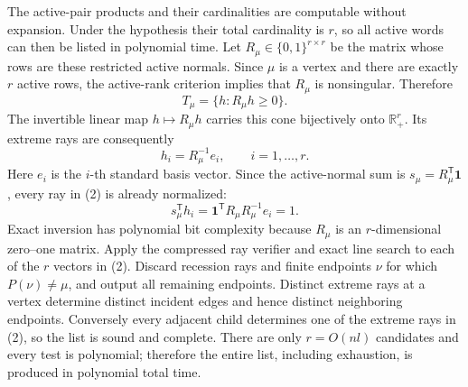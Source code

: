 The active-pair products and their cardinalities are computable without expansion. Under the hypothesis their total cardinality is \(r\), so all active words can then be listed in polynomial time. Let \(R_\mu\in\{0,1\}^{r\times r}\) be the matrix whose rows are these restricted active normals. Since \(\mu\) is a vertex and there are exactly \(r\) active rows, the active-rank criterion implies that \(R_\mu\) is nonsingular. Therefore
\[T_\mu=\{h:R_\mu h\ge0\}.\tag{1}\]
The invertible linear map \(h\mapsto R_\mu h\) carries this cone bijectively onto \(\mathbb R_+^r\). Its extreme rays are consequently
\[h_i=R_\mu^{-1}e_i,\qquad i=1,\ldots,r.\tag{2}\]
Here \(e_i\) is the \(i\)-th standard basis vector. Since the active-normal sum is \(s_\mu=R_\mu^{\mathsf T}\mathbf1\), every ray in (2) is already normalized:
\[s_\mu^{\mathsf T}h_i=\mathbf1^{\mathsf T}R_\mu R_\mu^{-1}e_i=1.\tag{3}\]
Exact inversion has polynomial bit complexity because \(R_\mu\) is an \(r\)-dimensional zero--one matrix. Apply the compressed ray verifier and exact line search to each of the \(r\) vectors in (2). Discard recession rays and finite endpoints \(\nu\) for which \(P(\nu)\ne\mu\), and output all remaining endpoints. Distinct extreme rays at a vertex determine distinct incident edges and hence distinct neighboring endpoints. Conversely every adjacent child determines one of the extreme rays in (2), so the list is sound and complete. There are only \(r=O(nl)\) candidates and every test is polynomial; therefore the entire list, including exhaustion, is produced in polynomial total time.